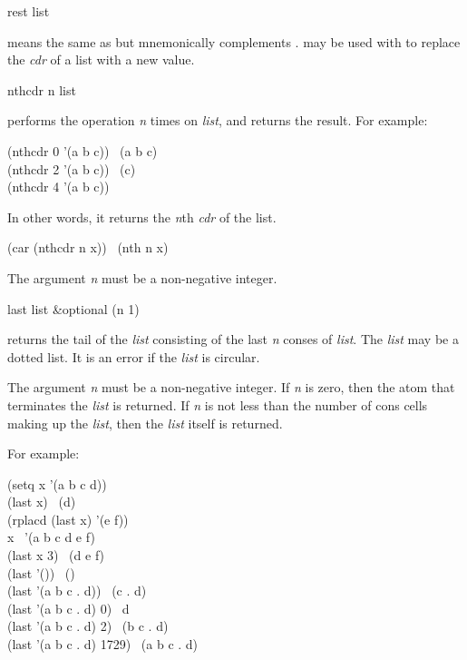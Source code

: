 \begin{defun}[Function]
rest list

 means the same as  but mnemonically complements .
 may be used with  to replace the \emph{cdr} of a list
with a new value.
\end{defun}

\begin{defun}[Function]
nthcdr n list

 performs the  operation \emph{n} times
on \emph{list}, and returns the result.
For example:
\begin{lisp}
(nthcdr 0 '(a b c)) \EV\ (a b c) \\
(nthcdr 2 '(a b c)) \EV\ (c) \\
(nthcdr 4 '(a b c)) \EV\ {\emptylist}
\end{lisp}
In other words, it returns the \emph{n}th \emph{cdr} of the list.

\begin{lisp}
(car (nthcdr n x)) \EQ\ (nth n x)
\end{lisp}
The argument \emph{n} must be a non-negative integer.
\end{defun}

\begin{defun}[Function]
last list &optional (n 1)

 returns the tail of the \emph{list}
consisting of the last \emph{n} conses of \emph{list}.  The \emph{list} may
be a dotted list.  It is an error if the \emph{list} is circular.

The argument \emph{n} must be a non-negative integer.
If \emph{n} is zero, then the atom that terminates the \emph{list}
is returned.  If \emph{n} is not less than the number of cons cells
making up the \emph{list}, then the \emph{list} itself is returned.

For example:
\begin{lisp}
(setq x '(a b c d)) \\
(last x) \EV\ (d) \\
(rplacd (last x) '(e f)) \\
x \EV\ '(a b c d e f) \\
(last x 3) \EV\ (d e f) \\
(last '()) \EV\ () \\
(last '(a b c . d)) \EV\ (c . d) \\
(last '(a b c . d) 0) \EV\ d \\
(last '(a b c . d) 2) \EV\ (b c . d) \\
(last '(a b c . d) 1729) \EV\ (a b c . d)
\end{lisp}
\end{defun}

